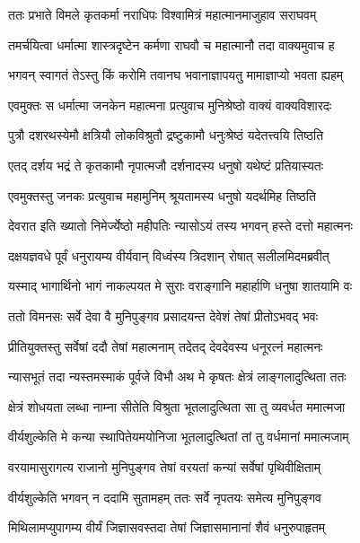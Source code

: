 
\twolineshloka
{ततः प्रभाते विमले कृतकर्मा नराधिपः}
{विश्वामित्रं महात्मानमाजुहाव सराघवम्} %

\twolineshloka
{तमर्चयित्वा धर्मात्मा शास्त्रदृष्टेन कर्मणा}
{राघवौ च महात्मानौ तदा वाक्यमुवाच ह} %

\twolineshloka
{भगवन् स्वागतं तेऽस्तु किं करोमि तवानघ}
{भवानाज्ञापयतु मामाज्ञाप्यो भवता ह्यहम्} %

\twolineshloka
{एवमुक्तः स धर्मात्मा जनकेन महात्मना}
{प्रत्युवाच मुनिश्रेष्ठो वाक्यं वाक्यविशारदः} %

\twolineshloka
{पुत्रौ दशरथस्येमौ क्षत्रियौ लोकविश्रुतौ}
{द्रष्टुकामौ धनुःश्रेष्ठं यदेतत्त्वयि तिष्ठति} %

\twolineshloka
{एतद् दर्शय भद्रं ते कृतकामौ नृपात्मजौ}
{दर्शनादस्य धनुषो यथेष्टं प्रतियास्यतः} %

\twolineshloka
{एवमुक्तस्तु जनकः प्रत्युवाच महामुनिम्}
{श्रूयतामस्य धनुषो यदर्थमिह तिष्ठति} %

\twolineshloka
{देवरात इति ख्यातो निमेर्ज्येष्ठो महीपतिः}
{न्यासोऽयं तस्य भगवन् हस्ते दत्तो महात्मनः} %

\twolineshloka
{दक्षयज्ञवधे पूर्वं धनुरायम्य वीर्यवान्}
{विध्वंस्य त्रिदशान् रोषात् सलीलमिदमब्रवीत्} %

\twolineshloka
{यस्माद् भागार्थिनो भागं नाकल्पयत मे सुराः}
{वराङ्गानि महार्हाणि धनुषा शातयामि वः} %

\twolineshloka
{ततो विमनसः सर्वे देवा वै मुनिपुङ्गव}
{प्रसादयन्त देवेशं तेषां प्रीतोऽभवद् भवः} %

\twolineshloka
{प्रीतियुक्तस्तु सर्वेषां ददौ तेषां महात्मनाम्}
{तदेतद् देवदेवस्य धनूरत्नं महात्मनः} %

\twolineshloka
{न्यासभूतं तदा न्यस्तमस्माकं पूर्वजे विभौ}
{अथ मे कृषतः क्षेत्रं लाङ्गलादुत्थिता ततः} %

\twolineshloka
{क्षेत्रं शोधयता लब्धा नाम्ना सीतेति विश्रुता}
{भूतलादुत्थिता सा तु व्यवर्धत ममात्मजा} %

\twolineshloka
{वीर्यशुल्केति मे कन्या स्थापितेयमयोनिजा}
{भूतलादुत्थितां तां तु वर्धमानां ममात्मजाम्} %

\twolineshloka
{वरयामासुरागत्य राजानो मुनिपुङ्गव}
{तेषां वरयतां कन्यां सर्वेषां पृथिवीक्षिताम्} %

\twolineshloka
{वीर्यशुल्केति भगवन् न ददामि सुतामहम्}
{ततः सर्वे नृपतयः समेत्य मुनिपुङ्गव} %

\twolineshloka
{मिथिलामप्युपागम्य वीर्यं जिज्ञासवस्तदा}
{तेषां जिज्ञासमानानां शैवं धनुरुपाहृतम्} %

